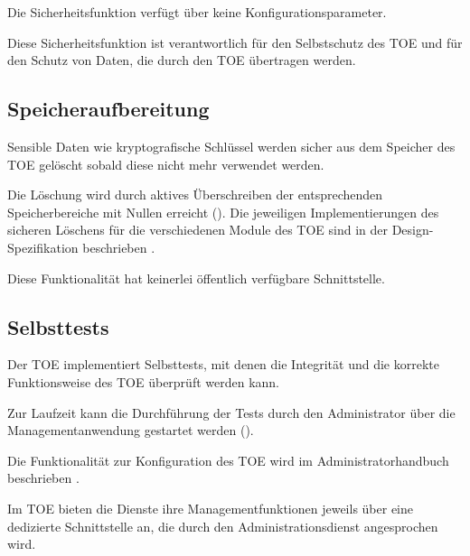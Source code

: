 

Die Sicherheitsfunktion verfügt über keine Konfigurationsparameter.

\sfdescription{}

Diese Sicherheitsfunktion ist verantwortlich für den Selbstschutz des
TOE und für den Schutz von Daten, die durch den TOE übertragen werden.

\subsection{Speicheraufbereitung}\label{sf.selfprotection.rip}

Sensible Daten wie kryptografische Schlüssel werden sicher aus dem Speicher des
TOE gelöscht sobald diese nicht mehr verwendet werden.

Die Löschung wird durch aktives Überschreiben der entsprechenden
Speicherbereiche mit Nullen erreicht (). Die jeweiligen
Implementierungen des sicheren Löschens für die verschiedenen Module des TOE
sind in der Design-Spezifikation beschrieben \cite{adv_tds}.

Diese Funktionalität hat keinerlei öffentlich verfügbare
Schnittstelle. 
\subsection{Selbsttests}\label{sf.selfprotection.selftest}

Der TOE implementiert Selbsttests, mit denen die Integrität und die
korrekte Funktionsweise des TOE überprüft werden kann.

Zur Laufzeit kann die Durchführung der Tests durch den Administrator
über die Managementanwendung gestartet werden ().

%



Die Funktionalität zur Konfiguration des TOE wird im Administratorhandbuch
beschrieben \autocite[Abschnitte~7.3 bis~7.6]{agd_adm}. 

\sfdescription{}

Im TOE bieten die Dienste ihre Managementfunktionen jeweils über eine dedizierte
Schnittstelle an, die durch den Administrationsdienst angesprochen wird.

